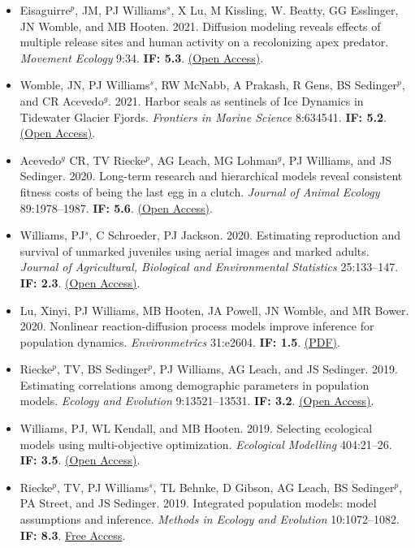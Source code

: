 \begin{itemize}
\item Eisaguirre$^p$, JM, PJ Williams$^s$, X Lu, M Kissling, W. Beatty, GG Esslinger, JN Womble, and MB Hooten. 2021. Diffusion modeling reveals effects of multiple release sites and human activity on a recolonizing apex predator. \emph{Movement Ecology} 9:34. \textbf{IF: 5.3}. \href{https://movementecologyjournal.biomedcentral.com/articles/10.1186/s40462-021-00270-w}{(Open Access)}.
\item Womble, JN, PJ Williams$^s$, RW McNabb, A Prakash, R Gens, BS Sedinger$^p$, and CR Acevedo$^g$. 2021. Harbor seals as sentinels of Ice Dynamics in Tidewater Glacier Fjords. \emph{Frontiers in Marine Science} 8:634541. \textbf{IF: 5.2}. \href{https://www.frontiersin.org/articles/10.3389/fmars.2021.634541/full}{(Open Access)}.
\item Acevedo$^g$ CR, TV Riecke$^p$, AG Leach, MG Lohman$^g$, PJ Williams, and JS Sedinger. 2020. Long-term research and hierarchical models reveal consistent fitness costs of being the last egg in a clutch. \emph{Journal of Animal Ecology} 89:1978--1987. \textbf{IF: 5.6}. \href{https://besjournals.onlinelibrary.wiley.com/doi/10.1111/1365-2656.13232}{(Open Access)}.
\item Williams, PJ$^s$, C Schroeder, PJ Jackson. 2020. Estimating reproduction and survival of unmarked juveniles using aerial images and marked adults. \emph{Journal of Agricultural, Biological and Environmental Statistics} 25:133--147. \textbf{IF: 2.3}. \href{https://link.springer.com/article/10.1007/s13253-020-00384-5}{(Open Access)}.
\item Lu, Xinyi, PJ Williams, MB Hooten, JA Powell, JN Womble, and MR Bower. 2020. Nonlinear reaction-diffusion process models improve inference for population dynamics. \emph{Environmetrics} 31:e2604. \textbf{IF: 1.5}. \href{http://www.perrywilliams.us/wp-content/uploads/2023/05/lu2020nonlinear.pdf}{(PDF)}.
\item Riecke$^p$, TV, BS Sedinger$^p$, PJ Williams, AG Leach, and JS Sedinger. 2019. Estimating correlations among demographic parameters in population models. \emph{Ecology and Evolution} 9:13521--13531. \textbf{IF: 3.2}. \href{https://onlinelibrary.wiley.com/doi/10.1002/ece3.5809}{(Open Access)}.
\item Williams, PJ, WL Kendall, and MB Hooten. 2019. Selecting ecological models using multi-objective optimization. \emph{Ecological Modelling} 404:21--26. \textbf{IF: 3.5}. \href{https://www.sciencedirect.com/science/article/pii/S0304380019301577?via%3Dihub}{(Open Access)}.
\item Riecke$^p$, TV, PJ Williams$^s$, TL Behnke, D Gibson, AG Leach, BS Sedinger$^p$, PA Street, and JS Sedinger. 2019. Integrated population models: model assumptions and inference. \emph{Methods in Ecology and Evolution} 10:1072--1082. \textbf{IF: 8.3}. \href{https://besjournals.onlinelibrary.wiley.com/doi/10.1111/2041-210X.13195}{Free Access}.

\end{itemize}

